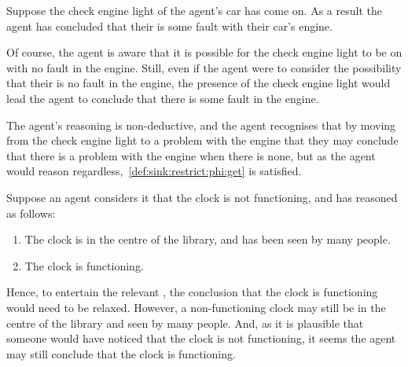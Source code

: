 \begin{note}
  \begin{illustration}
    Suppose the check engine light of the agent's car has come on.
    As a result the agent has concluded that their is some fault with their car's engine.

    Of course, the agent is aware that it is possible for the check engine light to be on with no fault in the engine.
    Still, even if the agent were to consider the possibility that their is no fault in the engine, the presence of the check engine light would lead the agent to conclude that there is some fault in the engine.
  \end{illustration}

  The agent's reasoning is non-deductive, and the agent recognises that by moving from the check engine light to a problem with the engine that they may conclude that there is a problem with the engine when there is none, but as the agent would reason regardless,~\ref{def:sink:restrict:phi:get} is satisfied.
\end{note}

\begin{note}
  \label{ideaS:illu:clock}
  \begin{illustration}
    Suppose an agent considers it \epPAd{} that the clock is not functioning, and has reasoned as follows:
    \begin{enumerate}
    \item The clock is in the centre of the library, and has been seen by many people.
    \item The clock is functioning.
    \end{enumerate}
    \vspace{-\baselineskip}
  \end{illustration}

  Hence, to entertain the relevant \epP{}, the conclusion that the clock is functioning would need to be relaxed.
  However, a non-functioning clock may still be in the centre of the library and seen by many people.
  And, as it is plausible that someone would have noticed that the clock is not functioning, it seems the agent may still conclude that the clock is functioning.
\end{note}

